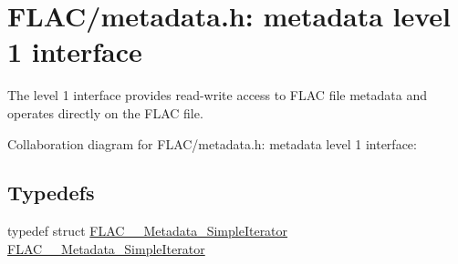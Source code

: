 \hypertarget{group__flac__metadata__level1}{}\section{F\+L\+A\+C/metadata.h\+: metadata level 1 interface}
\label{group__flac__metadata__level1}


The level 1 interface provides read-\/write access to F\+L\+AC file metadata and operates directly on the F\+L\+AC file.  


Collaboration diagram for F\+L\+A\+C/metadata.h\+: metadata level 1 interface\+:
\subsection*{Typedefs}
\begin{DoxyCompactItemize}
\item 
typedef struct \hyperlink{group__flac__metadata__level1_ga6accccddbb867dfc2eece9ee3ffecb3a}{F\+L\+A\+C\+\_\+\+\_\+\+Metadata\+\_\+\+Simple\+Iterator} \hyperlink{group__flac__metadata__level1_ga6accccddbb867dfc2eece9ee3ffecb3a}{F\+L\+A\+C\+\_\+\+\_\+\+Metadata\+\_\+\+Simple\+Iterator}
\end{DoxyCompactItemize}
